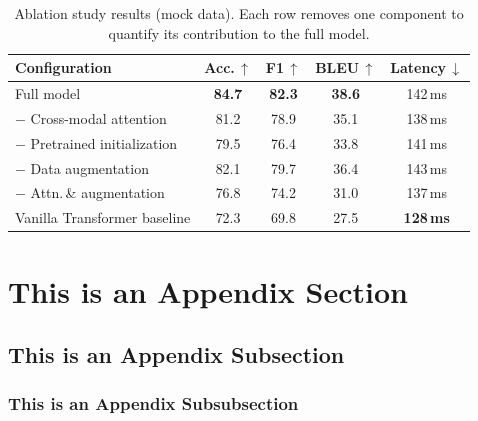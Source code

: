 \documentclass[opendfm]{xlance/xlance}
\begin{document}
\begin{table}[H]
    \centering
    \begin{tabular}{lcccc}
        \toprule
        \textbf{Configuration}        & \textbf{Acc.\,$\uparrow$} & \textbf{F1\,$\uparrow$} & \textbf{BLEU\,$\uparrow$} & \textbf{Latency\,$\downarrow$} \\
        \midrule
        \rowcolor{hidden-blue!40}
        Full model                    & \textbf{84.7}             & \textbf{82.3}           & \textbf{38.6}             & 142\,ms                        \\
        $-$ Cross-modal attention     & 81.2                      & 78.9                    & 35.1                      & 138\,ms                        \\
        $-$ Pretrained initialization & 79.5                      & 76.4                    & 33.8                      & 141\,ms                        \\
        $-$ Data augmentation         & 82.1                      & 79.7                    & 36.4                      & 143\,ms                        \\
        $-$ Attn.\,\& augmentation    & 76.8                      & 74.2                    & 31.0                      & 137\,ms                        \\
        \rowcolor{hidden-orange!40}
        Vanilla Transformer baseline  & 72.3                      & 69.8                    & 27.5                      & \textbf{128\,ms}               \\
        \bottomrule
    \end{tabular}
    \caption{Ablation study results (mock data). Each row removes one component to
    quantify its contribution to the full model.}
    \label{tab:ablation}
\end{table}

\newpage



\newpage
\appendix


\section{This is an Appendix Section}
\label{appendix:example}

\subsection{This is an Appendix Subsection}

\subsubsection{This is an Appendix Subsubsection}
\end{document}
